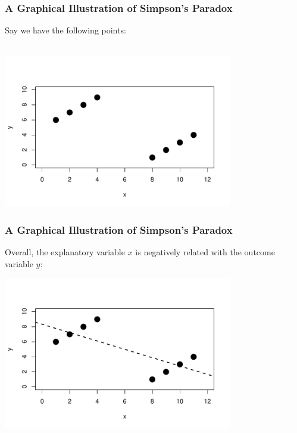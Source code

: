\documentclass[slides]{beamer}\usepackage[]{graphicx}\usepackage[]{color}
\newcommand{\blue}[1]{\textcolor{blue2}{#1}}
\begin{document}
\begin{frame}
\frametitle{A Graphical Illustration of Simpson's Paradox}
Say we have the following points: \textcolor{white}{lorem ipsum lorem ipsum lorem ipsum lorem ipsum}
\begin{center}
\includegraphics[width=10cm]{simpsons1.pdf}
\end{center}

\end{frame}



\begin{frame}
\frametitle{A Graphical Illustration of Simpson's Paradox}
Overall, the explanatory variable $x$ is \blue{negatively} related with the outcome variable $y$:
\begin{center}
\includegraphics[width=10cm]{simpsons2.pdf}
\end{center}

\end{frame}
\end{document}
